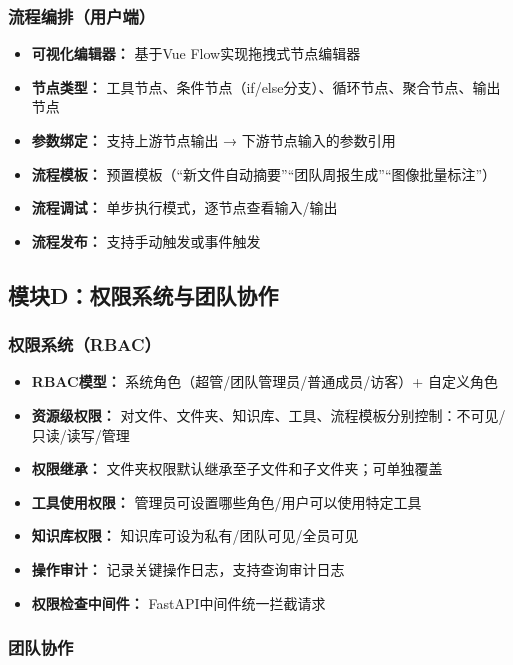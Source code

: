\documentclass[a4paper,zihao=-4]{ctexart}
\begin{document}
\subsubsection{流程编排（用户端）}

\begin{itemize}
  \item \textbf{可视化编辑器：} 基于Vue Flow实现拖拽式节点编辑器
  \item \textbf{节点类型：} 工具节点、条件节点（if/else分支）、循环节点、聚合节点、输出节点
  \item \textbf{参数绑定：} 支持上游节点输出 → 下游节点输入的参数引用
  \item \textbf{流程模板：} 预置模板（“新文件自动摘要”“团队周报生成”“图像批量标注”）
  \item \textbf{流程调试：} 单步执行模式，逐节点查看输入/输出
  \item \textbf{流程发布：} 支持手动触发或事件触发
\end{itemize}

\subsection{模块D：权限系统与团队协作}

\subsubsection{权限系统（RBAC）}

\begin{itemize}
  \item \textbf{RBAC模型：} 系统角色（超管/团队管理员/普通成员/访客）+ 自定义角色
  \item \textbf{资源级权限：} 对文件、文件夹、知识库、工具、流程模板分别控制：不可见/只读/读写/管理
  \item \textbf{权限继承：} 文件夹权限默认继承至子文件和子文件夹；可单独覆盖
  \item \textbf{工具使用权限：} 管理员可设置哪些角色/用户可以使用特定工具
  \item \textbf{知识库权限：} 知识库可设为私有/团队可见/全员可见
  \item \textbf{操作审计：} 记录关键操作日志，支持查询审计日志
  \item \textbf{权限检查中间件：} FastAPI中间件统一拦截请求
\end{itemize}

\subsubsection{团队协作}
\end{document}
